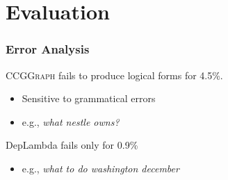 \documentclass[mathserif,12pt]{beamer}
\newcommand \ccggraph{\textsc{CCGGraph}\xspace}
\begin{document}
\begin{frame}
\end{frame}

\section{Evaluation} 

\begin{frame}
\frametitle{Error Analysis}
\large
 \ccggraph fails to produce logical forms for 4.5\%.
 \begin{itemize}
  \item Sensitive to grammatical errors
  \item e.g., \textsl{what nestle owns?}
 \end{itemize}  
 
 \vspace{2em}
 DepLambda fails only for 0.9\%
 \begin{itemize}
   \item e.g., \textsl{what to do washington december}
 \end{itemize}  
\end{frame}
\end{document}
